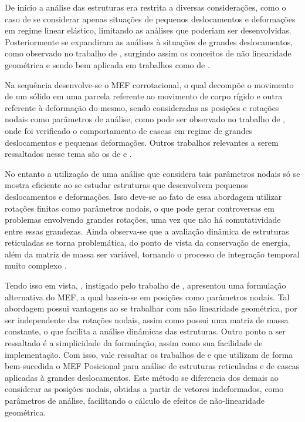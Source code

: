 De início a análise das estruturas era restrita a diversas considerações, como o caso de se considerar apenas situações de pequenos deslocamentos e deformações em regime linear elástico, limitando as análises que poderiam ser desenvolvidas. Posteriormente se expandiram as análises à situações de grandes deslocamentos, como observado no trabalho de , surgindo assim os conceitos de não linearidade geométrica e sendo bem aplicada em trabalhos como de .

Na sequência desenvolve-se o MEF corrotacional, o qual decompõe o movimento de um sólido em uma parcela referente ao movimento de corpo rígido e outra referente à deformação do mesmo, sendo consideradas as posições e rotações nodais como parâmetros de análise, como pode ser observado no trabalho de , onde foi verificado o comportamento de cascas em regime de grandes deslocamentos e pequenas deformações. Outros trabalhos relevantes a serem ressaltados nesse tema são os de  e .

No entanto a utilização de uma análise que considera tais parâmetros nodais só se mostra eficiente ao se estudar estruturas que desenvolvem pequenos deslocamentos e deformações. Isso deve-se ao fato de essa abordagem utilizar rotações finitas como parâmetros nodais, o que pode gerar controversas em problemas envolvendo grandes rotações, uma vez que não há comutatividade entre essas grandezas. Ainda observa-se que a avaliação dinâmica de estruturas reticuladas se torna problemática, do ponto de vista da conservação de energia, além da matriz de massa ser variável, tornando o processo de integração temporal muito complexo \cite{sanches2013unconstrained}.

Tendo isso em vista, , instigado pelo trabalho de , apresentou uma formulação alternativa do MEF, a qual baseia-se em posições como parâmetros nodais. Tal abordagem possui vantagens ao se trabalhar com não linearidade geométrica, por ser independente das rotações nodais, assim como possui uma matriz de massa constante, o que facilita a análise dinâmicas das estruturas. Outro ponto a ser ressaltado é a simplicidade da formulação, assim como sua facilidade de implementação. Com isso, vale ressaltar os trabalhos de  e  que utilizam de forma bem-sucedida o MEF Posicional para análise de estruturas reticuladas e de cascas aplicadas à grandes deslocamentos. Este método se diferencia dos demais ao considerar as posições nodais, obtidas a partir de vetores indeformados, como parâmetros de análise, facilitando o cálculo de efeitos de não-linearidade geométrica.

